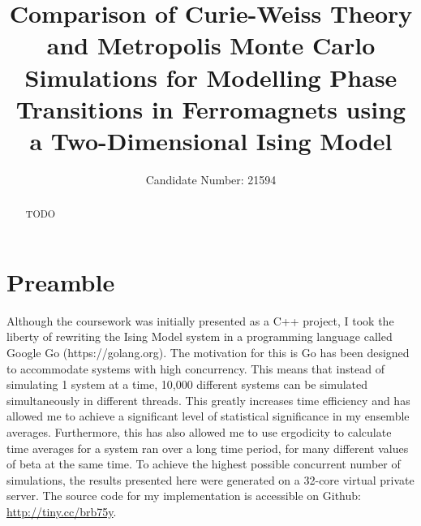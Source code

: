 \documentclass[11pt]{iopart}
\begin{document}
\section*{Preamble}
Although the coursework was initially presented as a C++ project, I took the liberty of rewriting the Ising Model system in a programming language called Google Go (https://golang.org). The motivation for this is Go has been designed to accommodate systems with high concurrency. This means that instead of simulating 1 system at a time, 10,000 different systems can be simulated simultaneously in different threads. This greatly increases time efficiency and has allowed me to achieve a significant level of statistical significance in my ensemble averages. Furthermore, this has also allowed me to use ergodicity to calculate time averages for a system ran over a long time period, for many different values of beta at the same time. To achieve the highest possible concurrent number of simulations, the results presented here were generated on a 32-core virtual private server. The source code for my implementation is accessible on Github: \url{http://tiny.cc/brb75y}.\cleardoublepage

\setlength{\marginparwidth}{1.5cm}

\title[]{Comparison of Curie-Weiss Theory and Metropolis Monte Carlo Simulations for Modelling Phase Transitions in Ferromagnets using a Two-Dimensional Ising Model}

\author{Candidate Number: 21594}

\address{Department of Physics,
University of Bath, Bath BA2 7AY, United Kingdom}
\begin{abstract}
TODO
\end{abstract}


\end{document}
